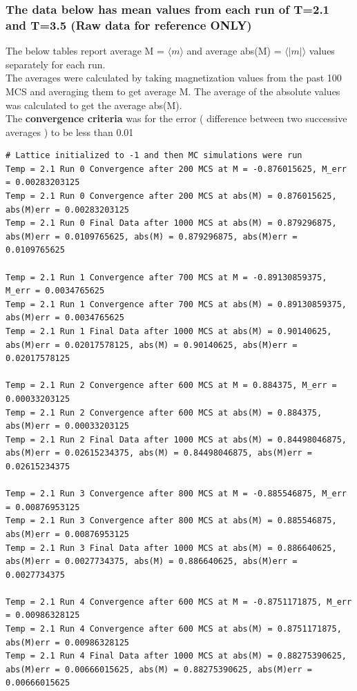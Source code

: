 \documentclass[a4paper,11pt]{article}
\begin{document}
\subsubsection{The data below has mean values from each run of T=2.1 and T=3.5 (Raw data for reference ONLY)}
The below tables report average M = $\langle m \rangle$ and average abs(M) = $\langle \left|m\right| \rangle$ values separately for each run. \\
The averages were calculated by taking magnetization values from the past 100 MCS and averaging them to get average M. The average of the absolute values was calculated to get the average abs(M).\\
The \textbf{convergence criteria} was for the error ( difference between two successive averages ) to be less than 0.01
\begin{lstlisting}[caption=Average Magnetization values for T 2.1]
# Lattice initialized to -1 and then MC simulations were run
Temp = 2.1 Run 0 Convergence after 200 MCS at M = -0.876015625, M_err = 0.00283203125
Temp = 2.1 Run 0 Convergence after 200 MCS at abs(M) = 0.876015625, abs(M)err = 0.00283203125
Temp = 2.1 Run 0 Final Data after 1000 MCS at abs(M) = 0.879296875, abs(M)err = 0.0109765625, abs(M) = 0.879296875, abs(M)err = 0.0109765625

Temp = 2.1 Run 1 Convergence after 700 MCS at M = -0.89130859375, M_err = 0.0034765625
Temp = 2.1 Run 1 Convergence after 700 MCS at abs(M) = 0.89130859375, abs(M)err = 0.0034765625
Temp = 2.1 Run 1 Final Data after 1000 MCS at abs(M) = 0.90140625, abs(M)err = 0.02017578125, abs(M) = 0.90140625, abs(M)err = 0.02017578125

Temp = 2.1 Run 2 Convergence after 600 MCS at M = 0.884375, M_err = 0.00033203125
Temp = 2.1 Run 2 Convergence after 600 MCS at abs(M) = 0.884375, abs(M)err = 0.00033203125
Temp = 2.1 Run 2 Final Data after 1000 MCS at abs(M) = 0.84498046875, abs(M)err = 0.02615234375, abs(M) = 0.84498046875, abs(M)err = 0.02615234375

Temp = 2.1 Run 3 Convergence after 800 MCS at M = -0.885546875, M_err = 0.00876953125
Temp = 2.1 Run 3 Convergence after 800 MCS at abs(M) = 0.885546875, abs(M)err = 0.00876953125
Temp = 2.1 Run 3 Final Data after 1000 MCS at abs(M) = 0.886640625, abs(M)err = 0.0027734375, abs(M) = 0.886640625, abs(M)err = 0.0027734375

Temp = 2.1 Run 4 Convergence after 600 MCS at M = -0.8751171875, M_err = 0.00986328125
Temp = 2.1 Run 4 Convergence after 600 MCS at abs(M) = 0.8751171875, abs(M)err = 0.00986328125
Temp = 2.1 Run 4 Final Data after 1000 MCS at abs(M) = 0.88275390625, abs(M)err = 0.00666015625, abs(M) = 0.88275390625, abs(M)err = 0.00666015625


\end{lstlisting}
\end{document}
